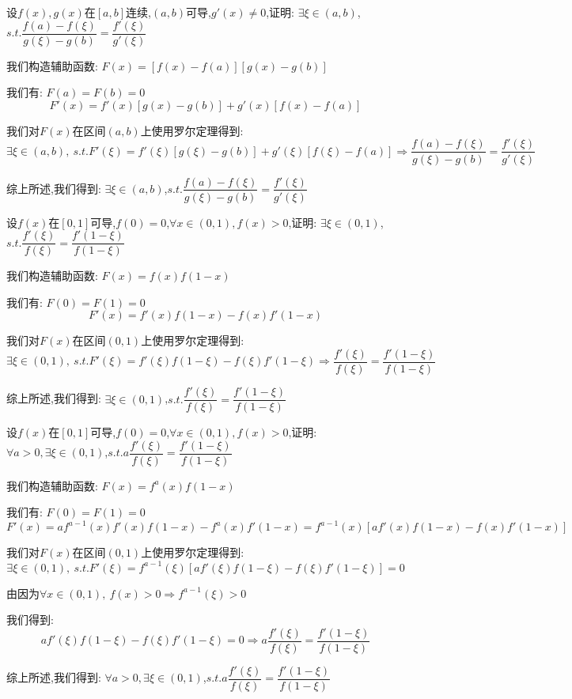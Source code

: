 \begin{proposition}
	设$f(x),g(x)$在$[a,b]$连续,$(a,b)$可导,$g'(x)\neq 0$,证明: $\exists \xi\in(a,b)$,$s.t. \dfrac{f(a)-f(\xi)}{g(\xi)-g(b)}=\dfrac{f'(\xi)}{g'(\xi)}$
\end{proposition}
\begin{solution}

	我们构造辅助函数: $F(x)=[f(x)-f(a)][g(x)-g(b)]$

	我们有: $F(a)=F(b)=0$
	$$F'(x)=f'(x)[g(x)-g(b)]+g'(x)[f(x)-f(a)]$$

	我们对$F(x)$在区间$(a,b)$上使用罗尔定理得到:
	$$\exists \xi\in(a,b),\ s.t. F'(\xi)=f'(\xi)[g(\xi)-g(b)]+g'(\xi)[f(\xi)-f(a)]\Rightarrow \dfrac{f(a)-f(\xi)}{g(\xi)-g(b)}=\dfrac{f'(\xi)}{g'(\xi)}$$

	综上所述,我们得到: $\exists \xi\in(a,b)$,$s.t. \dfrac{f(a)-f(\xi)}{g(\xi)-g(b)}=\dfrac{f'(\xi)}{g'(\xi)}$
\end{solution}


\begin{proposition}
	设$f(x)$在$[0,1]$可导,$f(0)=0$,$\forall x\in(0,1),f(x)>0$,证明: $\exists \xi\in(0,1)$,$s.t. \dfrac{f'(\xi)}{f(\xi)}=\dfrac{f'(1-\xi)}{f(1-\xi)}$
\end{proposition}
\begin{solution}

	我们构造辅助函数: $F(x)=f(x)f(1-x)$

	我们有: $F(0)=F(1)=0$
	$$F'(x)=f'(x)f(1-x)-f(x)f'(1-x)$$

	我们对$F(x)$在区间$(0,1)$上使用罗尔定理得到:
	$$\exists\xi\in(0,1),\ s.t. F'(\xi)=f'(\xi)f(1-\xi)-f(\xi)f'(1-\xi)\Rightarrow \dfrac{f'(\xi)}{f(\xi)}=\dfrac{f'(1-\xi)}{f(1-\xi)}$$

	综上所述,我们得到: $\exists \xi\in(0,1)$,$s.t. \dfrac{f'(\xi)}{f(\xi)}=\dfrac{f'(1-\xi)}{f(1-\xi)}$
\end{solution}


\begin{proposition}
	设$f(x)$在$[0,1]$可导,$f(0)=0$,$\forall x\in(0,1),f(x)>0$,证明: $\forall a>0,\exists \xi\in(0,1)$,$s.t. a\dfrac{f'(\xi)}{f(\xi)}=\dfrac{f'(1-\xi)}{f(1-\xi)}$
\end{proposition}
\begin{solution}

	我们构造辅助函数: $F(x)=f^{a}(x)f(1-x)$

	我们有: $F(0)=F(1)=0$
	$$F'(x)=af^{a-1}(x)f'(x)f(1-x)-f^{a}(x)f'(1-x)=f^{a-1}(x)[af'(x)f(1-x)-f(x)f'(1-x)]$$

	我们对$F(x)$在区间$(0,1)$上使用罗尔定理得到:
	$$\exists\xi\in(0,1),\ s.t. F'(\xi)=f^{a-1}(\xi)[af'(\xi)f(1-\xi)-f(\xi)f'(1-\xi)]=0$$

	由因为$\forall x\in(0,1),\ f(x)>0\Rightarrow f^{a-1}(\xi)>0$

	我们得到:
	$$af'(\xi)f(1-\xi)-f(\xi)f'(1-\xi)=0\Rightarrow a\dfrac{f'(\xi)}{f(\xi)}=\dfrac{f'(1-\xi)}{f(1-\xi)}$$

	综上所述,我们得到: $\forall a>0,\exists \xi\in(0,1)$,$s.t. a\dfrac{f'(\xi)}{f(\xi)}=\dfrac{f'(1-\xi)}{f(1-\xi)}$
\end{solution}


